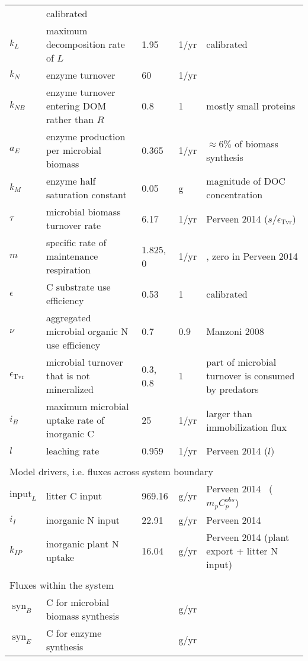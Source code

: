 \begin{table}[t]
\begin{tabular}{lp{6cm}llp{5.5cm}}
& calibrated \\
$k_L$ &  maximum decomposition rate of $L$ &  1.95 & 1/yr
& calibrated \\
$k_N$ &  enzyme turnover &  60 & 1/yr & \citep{Burns13} \\
$k_{NB}$ & enzyme turnover entering DOM rather than $R$ & 
0.8 & 1 & mostly small proteins \\
$a_{E}$ &  enzyme production per microbial biomass & 0.365 &
1/yr & $\approx 6\%$ of biomass synthesis \\ 
$k_{M}$ &  enzyme half saturation constant & 0.05 & g & magnitude of DOC
concentration \\
$\tau$ &  microbial biomass turnover rate & 6.17 & 1/yr & Perveen 2014
($s/\epsilon_{\operatorname{Tvr}}$) \\
$m$ & specific rate of maintenance respiration & 1.825, 0 & 
1/yr & \citep{Bodegom07}, zero in Perveen 2014 \\
$\epsilon$ & C substrate use efficiency & 0.53 &
1 & calibrated \\ %
$\nu$ & aggregated microbial organic N use efficiency & 0.7 &
0.9 & Manzoni 2008 \\
$\epsilon_{\operatorname{Tvr}}$ & microbial turnover that is not
mineralized & 0.3,\,0.8 & 1 & part of microbial turnover is consumed by
predators
\\
$i_{B}$ & maximum microbial uptake rate of inorganic C & 25 & 1/yr 
& larger than immobilization flux \\
$l$ & leaching rate & 0.959 &
1/yr & Perveen 2014 ($l)$ \\
\\
\multicolumn{5}{l}{Model drivers, i.e. fluxes across system boundary}  \\ 
$\mathrm{input}_{L}$ & litter C input & 969.16 & g/yr 
& Perveen 2014 \, ($m_p C^{obs}_p$)\\
$i_{I}$ & inorganic N input & 22.91 & g/yr 
& Perveen 2014 \\
$k_{IP}$ & inorganic plant N uptake & 16.04 &  g/yr 
& Perveen 2014 (plant export + litter N input)\\
\\
\multicolumn{5}{l}{Fluxes within the system} \\
$\operatorname{syn}_B $ & C for microbial biomass synthesis &  & g/yr &
\\
$\operatorname{syn}_E $ & C for enzyme synthesis &  & g/yr & \\

\end{tabular}
\end{table}
